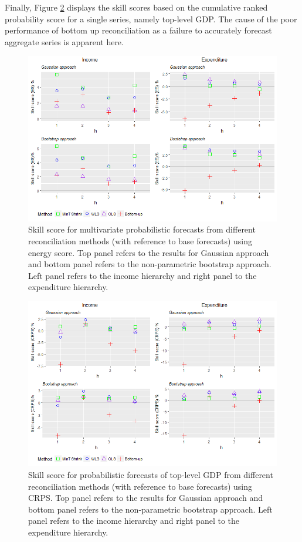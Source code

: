 \documentclass[graybox]{svmult}
\begin{document}
Finally, Figure \ref{fig: Prob-forecasts-SS_CRPS} displays the skill scores based on the cumulative ranked probability score for a single series, namely top-level GDP.  The cause of the poor performance of bottom up reconciliation as a failure to accurately forecast aggregate series is apparent here.

\begin{figure}[H]
	\centering
	\small
	\includegraphics[width=\textwidth]{Figs/Results/ProbF_MultivS.png}
	\caption{Skill score for multivariate probabilistic forecasts from different reconciliation methods (with reference to base forecasts) using energy score. Top panel refers to the results for Gaussian approach and bottom panel refers to the non-parametric bootstrap approach. Left panel refers to the income hierarchy and right panel to the expenditure hierarchy.}
	\label{fig: Prob-forecasts-SS_ES}
\end{figure}

\begin{figure}[H]
	\centering
	\small
	\includegraphics[width=\textwidth]{Figs/Results/ProbF_UnivS.png}
	\caption{Skill score for probabilistic forecasts of top-level GDP from different reconciliation methods (with reference to base forecasts) using CRPS. Top panel refers to the results for Gaussian approach and bottom panel refers to the non-parametric bootstrap approach. Left panel refers to the income hierarchy and right panel to the expenditure hierarchy.}
	\label{fig: Prob-forecasts-SS_CRPS}
\end{figure}
\end{document}
